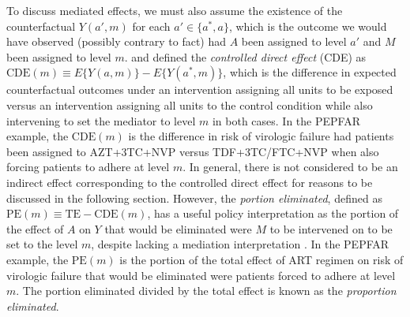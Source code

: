 \documentclass[12pt]{article}
\begin{document}
To discuss mediated effects, we must also assume the existence of the counterfactual $Y(a',m)$ for each $a'\in\{a^*,a\}$, which is the outcome we would have observed (possibly contrary to fact) had $A$ been assigned to level $a'$ and $M$ been assigned to level $m$. \cite{robins1992identifiability} and \cite{pearl2001direct} defined the \emph{controlled direct effect} (CDE) as $\text{CDE}(m)\equiv E\{Y(a,m)\}-E\{Y(a^*,m)\}$, which is the difference in expected counterfactual outcomes under an intervention assigning all units to be exposed versus an intervention assigning all units to the control condition while also intervening to set the mediator to level $m$ in both cases. In the PEPFAR example, the $\text{CDE}(m)$ is the difference in risk of virologic failure had patients been assigned to AZT+3TC+NVP versus TDF+3TC/FTC+NVP when also forcing patients to adhere at level $m$. In general, there is not considered to be an indirect effect corresponding to the controlled direct effect for reasons to be discussed in the following section. However, the \emph{portion eliminated}, defined as $\text{PE}(m)\equiv\text{TE} - \text{CDE}(m)$, has a useful policy interpretation as the portion of the effect of $A$ on $Y$ that would be eliminated were $M$ to be intervened on to be set to the level $m$, despite lacking a mediation interpretation \citep{robins1992identifiability}. In the PEPFAR example, the $\text{PE}(m)$ is the portion of the total effect of ART regimen on risk of virologic failure that would be eliminated were patients forced to adhere at level $m$. The portion eliminated divided by the total effect is known as the \emph{proportion eliminated}. %
\end{document}
